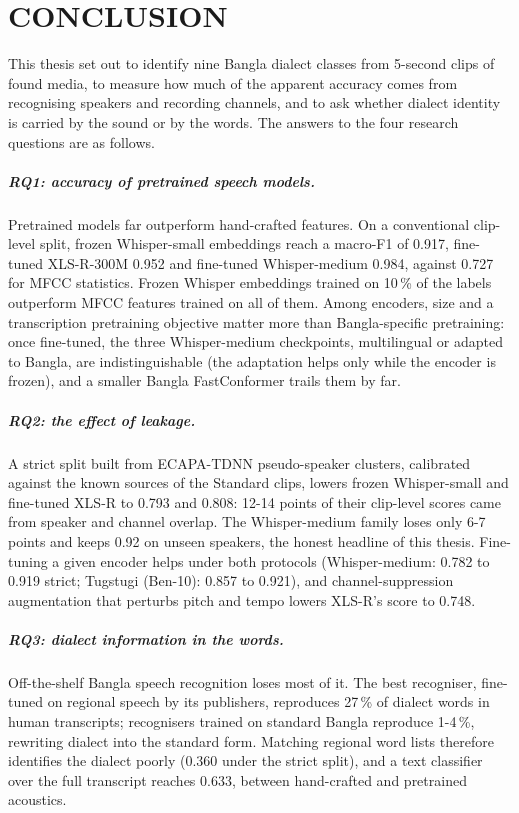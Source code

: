 \chapter{CONCLUSION}
\label{ch:conclusion}

This thesis set out to identify nine Bangla dialect classes from 5-second clips
of found media, to measure how much of the apparent accuracy comes from
recognising speakers and recording channels, and to ask whether dialect identity
is carried by the sound or by the words. The answers to the four research
questions are as follows.

\paragraph{RQ1: accuracy of pretrained speech models.} Pretrained models far
outperform hand-crafted features. On a conventional clip-level split, frozen
Whisper-small embeddings reach a macro-F1 of 0.917, fine-tuned XLS-R-300M
0.952 and fine-tuned Whisper-medium 0.984, against 0.727 for MFCC statistics.
Frozen Whisper embeddings trained on 10\,\% of the labels outperform MFCC
features trained on all of them. Among encoders, size and a transcription
pretraining objective matter more than Bangla-specific pretraining: once
fine-tuned, the three Whisper-medium checkpoints, multilingual or adapted to
Bangla, are indistinguishable (the adaptation helps only while the encoder is
frozen), and a smaller Bangla FastConformer trails them by far.

\paragraph{RQ2: the effect of leakage.} A strict split built from ECAPA-TDNN
pseudo-speaker clusters, calibrated against the known sources of the Standard
clips, lowers frozen Whisper-small and fine-tuned XLS-R to 0.793 and 0.808:
12-14 points of their clip-level scores came from speaker and channel
overlap. The Whisper-medium family loses only 6-7 points and keeps 0.92 on
unseen speakers, the honest headline of this thesis. Fine-tuning a given
encoder helps under both protocols (Whisper-medium: 0.782 to 0.919 strict;
Tugstugi (Ben-10): 0.857 to 0.921),
and channel-suppression augmentation that perturbs pitch and tempo lowers
XLS-R's score to 0.748.

\paragraph{RQ3: dialect information in the words.} Off-the-shelf Bangla speech
recognition loses most of it. The best recogniser, fine-tuned on regional speech
by its publishers, reproduces 27\,\% of dialect words in human transcripts;
recognisers trained on standard Bangla reproduce 1-4\,\%, rewriting dialect
into the standard form. Matching regional word lists therefore identifies the
dialect poorly (0.360 under the strict split), and a text classifier over the
full transcript reaches 0.633, between hand-crafted and pretrained acoustics.

